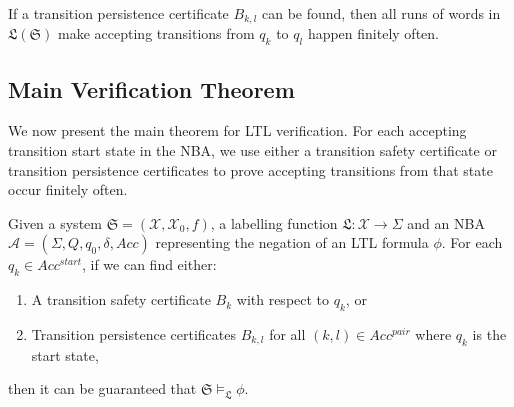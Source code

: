 \begin{lemma}
  \label{transition-persistence-lemma}
  If a transition persistence certificate $B_{k,l}$ can be found, then all runs of words in $\mathfrak{L}(\mathfrak{S})$ make accepting transitions from $q_k$ to $q_l$ happen finitely often.
\end{lemma}

\subsection{Main Verification Theorem}

We now present the main theorem for LTL verification. For each accepting transition start state in the NBA, we use either a transition safety certificate or transition persistence certificates to prove accepting transitions from that state occur finitely often.

\begin{theorem}
  \label{ltl-verification-theorem}
   Given a system $\mathfrak{S} = (\mathcal{X}, \mathcal{X}_0, f)$, a labelling function $\mathfrak{L}: \mathcal{X} \rightarrow \Sigma$ and an NBA $\mathcal{A} = (\Sigma, Q, q_0, \delta, Acc)$ representing the negation of an LTL formula $\phi$. For each $q_k \in Acc^{start}$, if we can find either:
  \begin{enumerate}
      \item A transition safety certificate $B_k$ with respect to $q_k$, or
      \item Transition persistence certificates $B_{k,l}$ for all $(k, l) \in Acc^{pair}$ where $q_k$ is the start state,
  \end{enumerate}
  then it can be guaranteed that $\mathfrak{S} \models_{\mathfrak{L}} \phi$.
\end{theorem}

